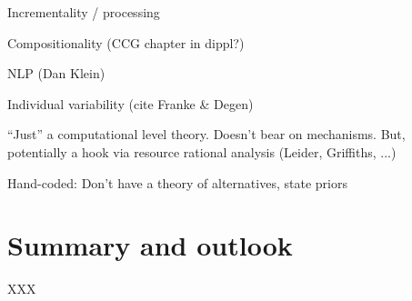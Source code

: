\documentclass{sp}
\begin{document}
Incrementality / processing

Compositionality (CCG chapter in dippl?)

NLP (Dan Klein)

Individual variability (cite Franke \& Degen)

``Just'' a computational level theory. Doesn't bear on mechanisms. But, potentially a hook via resource rational analysis (Leider, Griffiths, ...)

Hand-coded: Don't have a theory of alternatives, state priors

\section{Summary and outlook} \label{summary}

XXX




\end{document}
